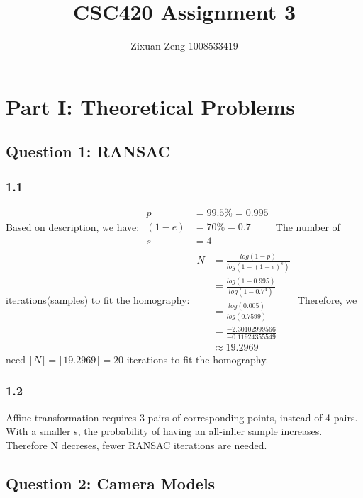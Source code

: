 \documentclass{article}
\title{CSC420 Assignment 3}
\author{Zixuan Zeng 1008533419}
\begin{document}
\date{}
\maketitle


\newpage
\section*{Part I: Theoretical Problems}
\subsection*{Question 1: RANSAC}
\subsubsection*{1.1}
Based on description, we have:\newline
$
\begin{aligned}
    p &= 99.5\% = 0.995\\
    (1 - e) &= 70\% = 0.7\\
    s &= 4\\
\end{aligned}
$\newline
The number of iterations(samples) to fit the homography:\newline
$
\begin{aligned}
    N &= \frac{log(1-p)}{log(1-(1-e)^s)}\\
    &=\frac{log(1-0.995)}{log(1-0.7^4)}\\
    &=\frac{log(0.005)}{log(0.7599)}\\
    &=\frac{-2.30102999566}{-0.11924355549}\\
    &\approx 19.2969
\end{aligned}
$\newline
Therefore, we need $\lceil N \rceil = \lceil 19.2969 \rceil = 20$ iterations to fit the homography.

\subsubsection*{1.2}
Affine transformation requires 3 pairs of corresponding points, instead of 4 pairs.
With a smaller s, the probability of having an all-inlier sample increases. Therefore N decreses, fewer RANSAC iterations are needed.


\newpage
\subsection*{Question 2: Camera Models}
\end{document}
